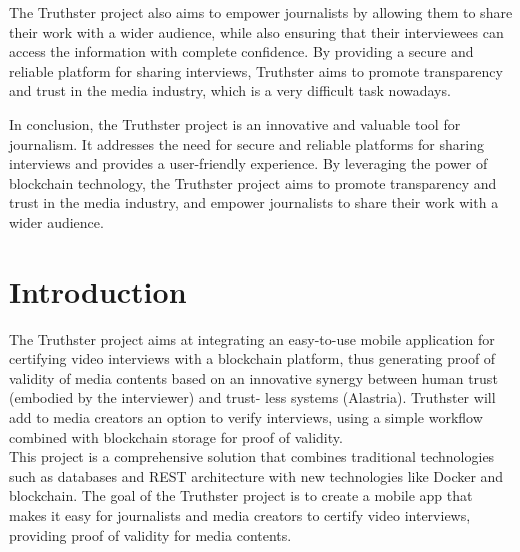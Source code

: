 \documentclass[target=mst,aauheader=]{thud}
\begin{document}
The Truthster project also aims to empower journalists by allowing them to share their work with a wider audience, while also ensuring that their interviewees can access the information with complete confidence. By providing a secure and reliable platform for sharing interviews, Truthster aims to promote transparency and trust in the media industry, which is a very difficult task nowadays.

In conclusion, the Truthster project is an innovative and valuable tool for journalism. It addresses the need for secure and reliable platforms for sharing interviews and provides a user-friendly experience. By leveraging the power of blockchain technology, the Truthster project aims to promote transparency and trust in the media industry, and empower journalists to share their work with a wider audience.

\tableofcontents



\mainmatter


\chapter{Introduction}

The Truthster project aims at integrating an easy-to-use mobile application for certifying video interviews with a blockchain platform, thus generating proof of validity of media contents based on an innovative synergy between human trust (embodied by the interviewer) and trust- less systems (Alastria). Truthster will add to media creators an option to verify interviews, using a simple workflow combined with blockchain storage for proof of validity.\\

This project is a comprehensive solution that combines traditional technologies such as databases and REST architecture with new technologies like Docker and blockchain. The goal of the Truthster project is to create a mobile app that makes it easy for journalists and media creators to certify video interviews, providing proof of validity for media contents.\\
\end{document}
